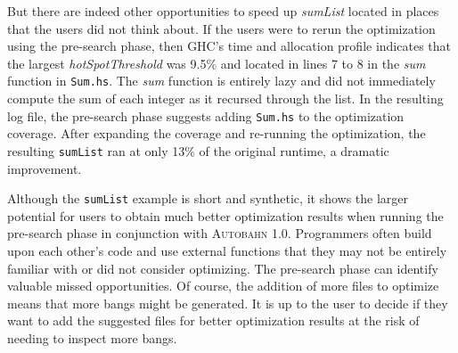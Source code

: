 \documentclass[format=sigplan, review=true, 9pt]{acmart}
\newcommand{\hotspots}[0]{hot spots}
\newcommand{\hotspotcost}[0]{\textit{hotSpotThreshold}}
\newcommand{\Ao}[0]{\textsc{Autobahn 1.0}}
\newcommand{\preopt}[0]{pre-search}
\begin{document}
But there are indeed other opportunities to speed up \textit{sumList}
located in places that the users did not think about. If the users were
to rerun the optimization using the \preopt{} phase, then GHC's time and
allocation profile indicates that the largest \hotspotcost{} was 9.5\%
and located in lines 7 to 8 in the \textit{sum} function
in \texttt{Sum.hs}. The \textit{sum} function is entirely lazy and did
not immediately compute the sum of each integer as it recursed through
the list. In the resulting log file, the \preopt{} phase 
suggests 
adding \texttt{Sum.hs} to the optimization coverage.
After expanding the coverage and re-running the optimization,
the resulting \texttt{sumList} ran at only 13\% of the original
runtime, a dramatic improvement.

Although the \texttt{sumList} example is short and synthetic, it shows
the larger potential for users to obtain much better optimization
results when running the \preopt{} phase in conjunction
with \Ao{}. Programmers often build upon each other's code and use
external functions that they may not be entirely familiar with or did
not consider optimizing. The \preopt{} phase can identify valuable
missed opportunities. Of
course, the addition of more files to optimize means that more bangs
might be generated. It is up to the user to decide if they want to add
the suggested files for better optimization results at the risk of
needing to inspect more bangs.
\newline

\end{document}

